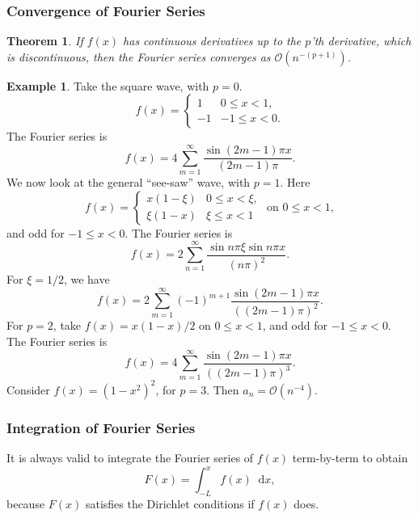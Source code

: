 \documentclass[12pt]{article}
\newcommand{\diff}{\mathop{}\!\mathrm{d}}
\newtheorem{theorem}{Theorem}[section]
\theoremstyle{definition}
\newtheorem{example}{Example}[section]
\theoremstyle{remark}
\begin{document}
\subsubsection{Convergence of Fourier Series}%
\label{subsub:convergence_of_fourier_series}

\begin{theorem}
	If $f(x)$ has continuous derivatives up to the $p$'th derivative, which is discontinuous, then the Fourier series converges as $\mathcal{O}(n^{-(p+1)})$.
\end{theorem}

\begin{adjustbox}{minipage = \columnwidth - 25.5pt, margin=1em, frame=1pt, margin=0em}
\begin{example}
	Take the square wave, with $p = 0$.
	\[
		f(x) =
		\begin{cases}
			1 & 0 \leq x < 1, \\
			-1 & -1 \leq x < 0.
		\end{cases}
	\]
	The Fourier series is
	\[
		f(x) = 4 \sum_{m = 1}^{\infty} \frac{\sin (2m - 1) \pi x}{(2m - 1)\pi}
	.\]
	We now look at the general ``see-saw'' wave, with $p = 1$. Here
	\[
		f(x) =
		\begin{cases}
			x(1 - \xi) & 0 \leq x < \xi, \\
			\xi(1 - x) & \xi \leq x < 1
		\end{cases}
		\text{ on } 0 \leq x < 1,
	\]
	and odd for $-1 \leq x < 0$. The Fourier series is
	\[
		f(x) = 2 \sum_{n = 1}^{\infty} \frac{\sin n \pi \xi \sin n \pi x}{(n \pi)^2}
	.\]
	For $\xi = 1/2$, we have
	\[
		f(x) = 2 \sum_{m = 1}^{\infty}(-1)^{m+1} \frac{\sin (2m - 1) \pi x}{((2m - 1)\pi)^2}
	.\]
	For $p = 2$, take $f(x) = x(1-x)/2$ on $0 \leq x < 1$, and odd for $-1 \leq x < 0$. The Fourier series is
	\[
		f(x) = 4 \sum_{m = 1}^{\infty} \frac{\sin (2m - 1) \pi x}{((2m - 1)\pi)^3}
	.\]
	Consider $f(x) = (1 - x^2)^2$, for $p = 3$. Then $a_n = \mathcal{O}(n^{-4})$.
\end{example}

\end{adjustbox}

\subsubsection{Integration of Fourier Series}%
\label{subsub:integration_of_fourier_series}

It is always valid to integrate the Fourier series of $f(x)$ term-by-term to obtain
\[
	F(x) = \int_{-L}^{x} f(x)\diff x
,\]
because $F(x)$ satisfies the Dirichlet conditions if $f(x)$ does.
\end{document}
